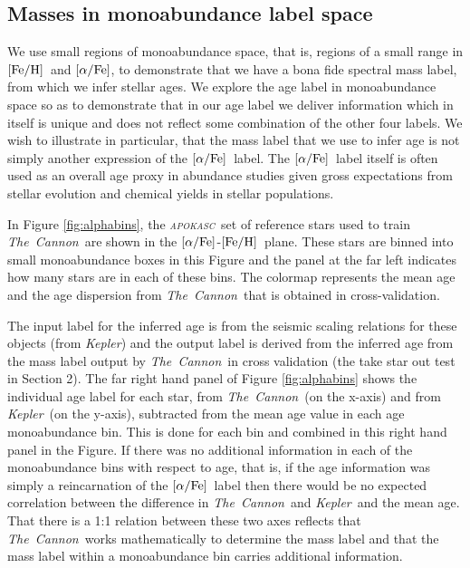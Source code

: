 \documentclass[12pt, preprint]{aastex}
\newcommand{\project}[1]{\textsl{#1}}
\newcommand{\tc}{\project{The~Cannon}}
\newcommand{\apokasc}{\project{\textsc{apokasc}}}
\newcommand{\kepler}{\project{Kepler}}
\newcommand{\feh}{\mbox{$\rm [Fe/H]$}}
\newcommand{\alphafe}{\mbox{$\rm [\alpha/Fe]$}}
\begin{document}
\subsection{Masses in monoabundance label space}

We use small regions of monoabundance space, that is, regions of a small range in \feh\ and \alphafe, to demonstrate that we have a bona fide spectral mass label, from which we infer stellar ages. We explore the age label in monoabundance space so as to demonstrate that in our age label we deliver information which in itself is unique and does not reflect some combination of the other four labels. We wish to illustrate in particular, that the mass label that we use to infer age is not simply another expression of the \alphafe\ label. The \alphafe\ label itself is often used as an overall age proxy in abundance studies given gross expectations from stellar evolution and chemical yields in stellar populations. 

In Figure \ref{fig:alphabins}, the \apokasc\ set of reference stars used to train \tc\ are shown in the \alphafe-\feh\ plane. These stars are binned into small monoabundance boxes in this Figure and the panel at the far left indicates how many stars are in each of these bins. The colormap represents the mean age and the age dispersion from \tc\ that is obtained in cross-validation.

The input label for the inferred age is from the seismic scaling relations for these objects (from \kepler) and the output label is derived from the inferred age from the mass label output by \tc\ in cross validation (the take star out test in Section 2). The far right hand panel of Figure \ref{fig:alphabins} shows the individual age label for each star, from \tc\ (on the x-axis) and from \kepler\ (on the y-axis), subtracted from the mean age value in each age monoabundance bin. This is done for each bin and combined in this right hand panel in the Figure. If there was no additional information in each of the monoabundance bins with respect to age, that is, if the age information was simply a reincarnation of the \alphafe\ label then there would be no expected correlation between the difference in \tc\ and \kepler\ and the mean age. That there is a 1:1 relation between these two axes reflects that \tc\ works mathematically to determine the mass label and that the mass label within a monoabundance bin carries additional information.
\end{document}
